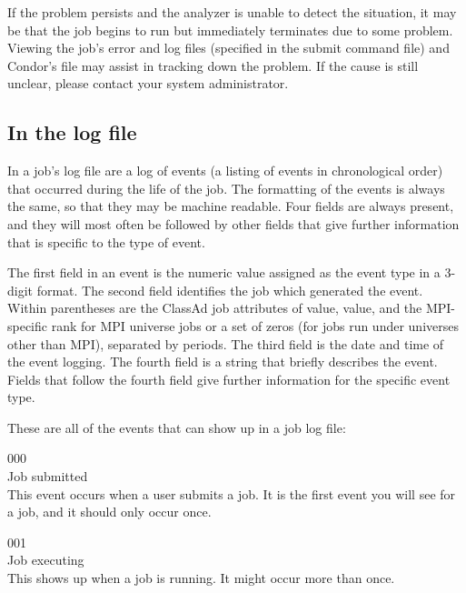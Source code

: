 If the problem persists and the analyzer is unable to detect the situation, it
may be that the job begins to run but immediately terminates due to some 
problem.  Viewing the job's error and log files
(specified in the submit command file) and Condor's  file
may assist in tracking down the problem.  If the cause is still unclear, please
contact your system administrator.

\subsection{\label{sec:job-log-events}In the log file}
In a job's log file are a log of events (a listing of events in
chronological order) that occurred during the life of the job.
The formatting of the events is always the same, 
so that they may be machine readable.
Four fields are always present,
and they will most often be followed by other fields that give further
information that is specific to the type of event.

The first field in an event is the numeric value assigned as the
event type in a 3-digit format.
The second field identifies the job which generated the event. 
Within parentheses are the ClassAd job attributes of
 value, 
 value, 
and the MPI-specific rank for MPI universe jobs or a set of zeros
(for jobs run under universes other than MPI),
separated by periods.
The third field is the date and time of the event logging.  
The fourth field is a string that briefly describes the event.
Fields that follow the fourth field give further information for the specific
event type.

These are all of the events that can show up in a job log file:

\noindent{} 000 \\
 Job submitted \\
 This event occurs when a user submits a job.
It is the first event you will see for a job, and it should only occur
once. 

\noindent{} 001 \\
 Job executing \\
 This shows up when a job is running.
It might occur more than once.

